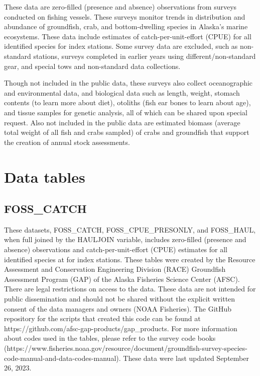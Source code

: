 \documentclass[
  letterpaper,
  oneside,
  open=any]{scrbook}
\begin{document}
These data are zero-filled (presence and absence) observations from
surveys conducted on fishing vessels. These surveys monitor trends in
distribution and abundance of groundfish, crab, and bottom-dwelling
species in Alaska's marine ecosystems. These data include estimates of
catch-per-unit-effort (CPUE) for all identified species for index
stations. Some survey data are excluded, such as non-standard stations,
surveys completed in earlier years using different/non-standard gear,
and special tows and non-standard data collections.

Though not included in the public data, these surveys also collect
oceanographic and environmental data, and biological data such as
length, weight, stomach contents (to learn more about diet), otoliths
(fish ear bones to learn about age), and tissue samples for genetic
analysis, all of which can be shared upon special request. Also not
included in the public data are estimated biomass (average total weight
of all fish and crabs sampled) of crabs and groundfish that support the
creation of annual stock assessments.

\hypertarget{data-tables-2}{%
\section{Data tables}\label{data-tables-2}}

\hypertarget{foss_catch}{%
\subsection{FOSS\_CATCH}\label{foss_catch}}

These datasets, FOSS\_CATCH, FOSS\_CPUE\_PRESONLY, and FOSS\_HAUL, when
full joined by the HAULJOIN variable, includes zero-filled (presence and
absence) observations and catch-per-unit-effort (CPUE) estimates for all
identified species at for index stations. These tables were created by
the Resource Assessment and Conservation Engineering Division (RACE)
Groundfish Assessment Program (GAP) of the Alaska Fisheries Science
Center (AFSC). There are legal restrictions on access to the data. These
data are not intended for public dissemination and should not be shared
without the explicit written consent of the data managers and owners
(NOAA Fisheries). The GitHub repository for the scripts that created
this code can be found at
https://github.com/afsc-gap-products/gap\_products. For more information
about codes used in the tables, please refer to the survey code books
(https://www.fisheries.noaa.gov/resource/document/groundfish-survey-species-code-manual-and-data-codes-manual).
These data were last updated September 26, 2023.
\end{document}

